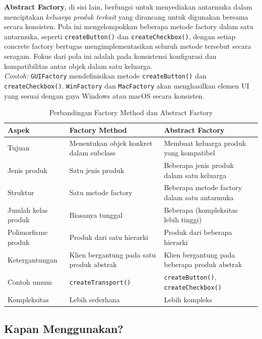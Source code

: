 \textbf{Abstract Factory}, di sisi lain, berfungsi untuk menyediakan antarmuka dalam menciptakan \textit{keluarga produk terkait} yang dirancang untuk digunakan bersama secara konsisten. Pola ini mengelompokkan beberapa metode factory dalam satu antarmuka, seperti \texttt{createButton()} dan \texttt{createCheckbox()}, dengan setiap concrete factory bertugas mengimplementasikan seluruh metode tersebut secara seragam. Fokus dari pola ini adalah pada konsistensi konfigurasi dan kompatibilitas antar objek dalam satu keluarga.\\
\textit{Contoh:} \texttt{GUIFactory} mendefinisikan metode \texttt{createButton()} dan \texttt{createCheckbox()}. \texttt{WinFactory} dan \texttt{MacFactory} akan menghasilkan elemen UI yang sesuai dengan gaya Windows atau macOS secara konsisten. 


\begin{table}
	\centering
	\begin{tabular}{|p{}|p{}|p{}|}
		\hline
		\rowcolor{gray!20} 
		\textbf{Aspek} & \textbf{Factory Method} & \textbf{Abstract Factory} \\
		\hline
		Tujuan & Menentukan objek konkret dalam subclass & Membuat keluarga produk yang kompatibel \\
		\hline
		Jenis produk & Satu jenis produk & Beberapa jenis produk dalam satu keluarga \\
		\hline
		Struktur & Satu metode factory & Beberapa metode factory dalam satu antarmuka \\
		\hline
		Jumlah kelas produk & Biasanya tunggal & Beberapa (kompleksitas lebih tinggi) \\
		\hline
		Polimorfisme produk & Produk dari satu hierarki & Produk dari beberapa hierarki \\
		\hline
		Ketergantungan & Klien bergantung pada satu produk abstrak & Klien bergantung pada beberapa produk abstrak \\
		\hline
		Contoh umum & \texttt{createTransport()} & \texttt{createButton()}, \texttt{createCheckbox()} \\
		\hline
		Kompleksitas & Lebih sederhana & Lebih kompleks \\
		\hline
	\end{tabular}
	\caption{Perbandingan Factory Method dan Abstract Factory}
	\label{tab:factory-comparison}
\end{table}


\subsection{Kapan Menggunakan?}

